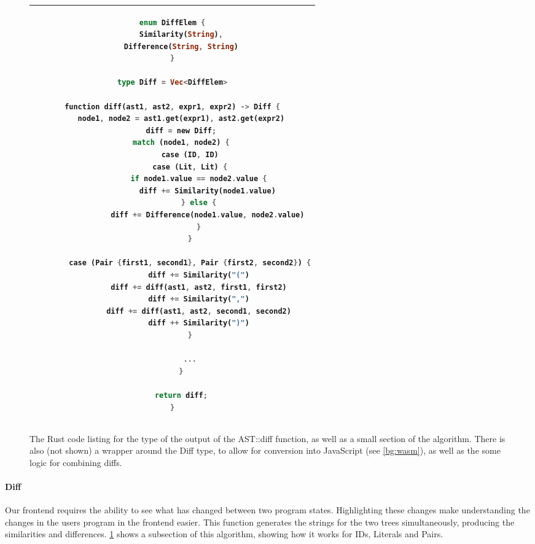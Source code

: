 
\begin{figure}[t]
    \centering
    \begin{tabular}{|c|}
        \hline
    \begin{lstlisting}[language=Rust]
enum DiffElem {
    Similarity(String),
    Difference(String, String)
}

type Diff = Vec<DiffElem>

function diff(ast1, ast2, expr1, expr2) -> Diff {
    node1, node2 = ast1.get(expr1), ast2.get(expr2)
    diff = new Diff;
    match (node1, node2) {
        case (ID, ID)
        case (Lit, Lit) {
            if node1.value == node2.value {
                diff += Similarity(node1.value)
            } else {
                diff += Difference(node1.value, node2.value)
            }
        }

        case (Pair {first1, second1}, Pair {first2, second2}) {
            diff += Similarity("(")
            diff += diff(ast1, ast2, first1, first2)
            diff += Similarity(",")
            diff += diff(ast1, ast2, second1, second2)
            diff ++ Similarity(")")
        }

        ...
    }
    
    return diff;
}
    \end{lstlisting}
    \\\hline
    \end{tabular}
    \caption{The Rust code listing for the type of the output of the AST::diff function, as well as a small section of the algorithm. There is also (not shown) a wrapper around the Diff type, to allow for conversion into JavaScript (see \ref{bg:wasm}), as well as the some logic for combining diffs.}
    \label{fig:diff_list}
\end{figure}

\paragraph{Diff} \label{paragraph:diff} Our frontend requires the ability to see what has changed between two program states. Highlighting these changes make understanding the changes in the users program in the frontend easier. This function generates the strings for the two trees simultaneously, producing the similarities and differences. \ref{fig:diff_list} shows a subsection of this algorithm, showing how it works for IDs, Literals and Pairs.


